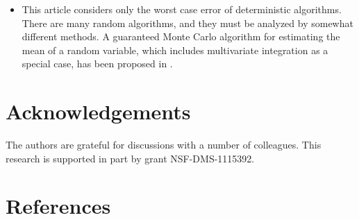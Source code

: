 \documentclass[]{elsarticle}
\theoremstyle{definition}
\theoremstyle{remark}
\begin{document}
\begin{itemize}
\item This article considers only the worst case error of deterministic algorithms.  There are many random algorithms, and they must be analyzed by somewhat different methods.  A guaranteed Monte Carlo algorithm for estimating the mean of a random variable, which includes multivariate integration as a special case, has been proposed in \cite{HicEtal14a}.

\end{itemize}

\section{Acknowledgements}  The authors are grateful for discussions with a number of colleagues. This research is supported in part by grant NSF-DMS-1115392.

\section*{References}

%

\end{document}
